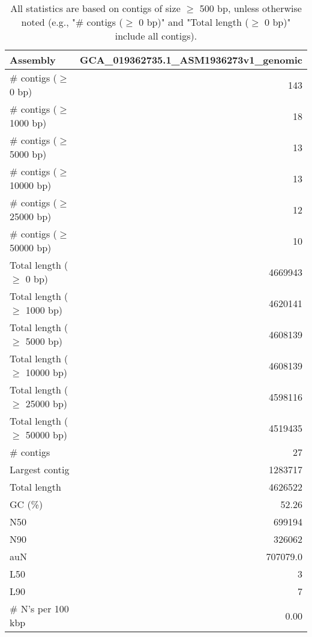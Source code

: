 \documentclass[12pt,a4paper]{article}
\begin{document}
\begin{table}[ht]
\begin{center}
\caption{All statistics are based on contigs of size $\geq$ 500 bp, unless otherwise noted (e.g., "\# contigs ($\geq$ 0 bp)" and "Total length ($\geq$ 0 bp)" include all contigs).}
\begin{tabular}{|l*{1}{|r}|}
\hline
Assembly & GCA\_019362735.1\_ASM1936273v1\_genomic \\ \hline
\# contigs ($\geq$ 0 bp) & 143 \\ \hline
\# contigs ($\geq$ 1000 bp) & 18 \\ \hline
\# contigs ($\geq$ 5000 bp) & 13 \\ \hline
\# contigs ($\geq$ 10000 bp) & 13 \\ \hline
\# contigs ($\geq$ 25000 bp) & 12 \\ \hline
\# contigs ($\geq$ 50000 bp) & 10 \\ \hline
Total length ($\geq$ 0 bp) & 4669943 \\ \hline
Total length ($\geq$ 1000 bp) & 4620141 \\ \hline
Total length ($\geq$ 5000 bp) & 4608139 \\ \hline
Total length ($\geq$ 10000 bp) & 4608139 \\ \hline
Total length ($\geq$ 25000 bp) & 4598116 \\ \hline
Total length ($\geq$ 50000 bp) & 4519435 \\ \hline
\# contigs & 27 \\ \hline
Largest contig & 1283717 \\ \hline
Total length & 4626522 \\ \hline
GC (\%) & 52.26 \\ \hline
N50 & 699194 \\ \hline
N90 & 326062 \\ \hline
auN & 707079.0 \\ \hline
L50 & 3 \\ \hline
L90 & 7 \\ \hline
\# N's per 100 kbp & 0.00 \\ \hline
\end{tabular}
\end{center}
\end{table}
\end{document}
